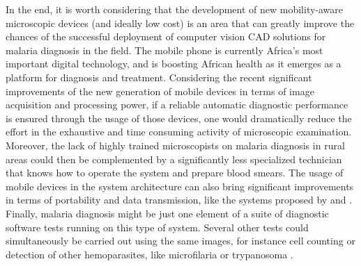 \documentclass[sensors,review,submit,moreauthors,pdftex,10pt,a4paper]{mdpi}
\begin{document}
In the end, it is worth considering that the development of new mobility-aware microscopic devices (and ideally low cost) is an area that can greatly improve the chances of the successful deployment of computer vision CAD solutions for malaria diagnosis in the field.
The mobile phone is currently Africa's most important digital technology, and is boosting African health as it emerges as a platform for diagnosis and treatment.
Considering the recent significant improvements of the new generation of mobile devices in terms of image acquisition and processing power, if a reliable automatic diagnostic performance is ensured through the usage of those devices, one would dramatically reduce the effort in the exhaustive and time consuming activity of microscopic examination.
Moreover, the lack of highly trained microscopists on malaria diagnosis in rural areas could then be complemented by a significantly less specialized technician that knows how to operate the system and prepare blood smears. The usage of mobile devices in the system architecture can also bring significant improvements in terms of portability and data transmission, like the systems proposed by \cite{Oliveira2017} and \cite{Rosado2017}.
Finally, malaria diagnosis might be just one element of a suite of diagnostic software tests running on this type of system. Several other tests could simultaneously be carried out using the same images, for instance cell counting or detection of other hemoparasites, like microfilaria or trypanosoma \cite{Rosado2016}.


%


\vspace{6pt}



\end{document}
